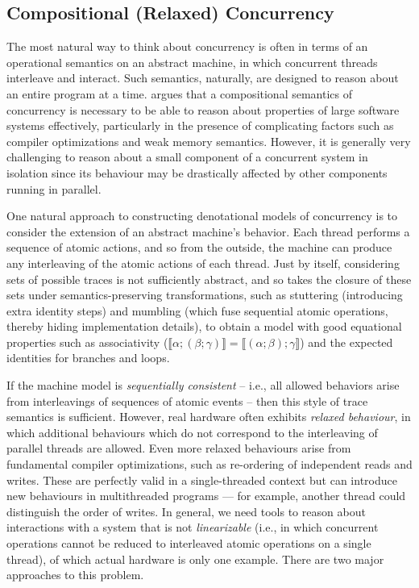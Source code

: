\documentclass[acmsmall,screen,review]{acmart}
\newcommand{\dnt}[1]{\llbracket{#1}\rrbracket}
\begin{document}
\subsection{Compositional (Relaxed) Concurrency}

The most natural way to think about concurrency is often in terms of an operational semantics on an
abstract machine, in which concurrent threads interleave and interact. Such semantics, naturally,
are designed to reason about an entire program at a time. \citet{batty-compositional-17} argues that
a compositional semantics of concurrency is necessary to be able to reason about properties of large
software systems effectively, particularly in the presence of complicating factors such as compiler
optimizations and weak memory semantics. However, it is generally very challenging to reason about a
small component of a concurrent system in isolation since its behaviour may be drastically affected
by other components running in parallel.

One natural approach to constructing denotational models of concurrency is to consider the
extension of an abstract machine's behavior. Each thread performs a sequence of atomic actions,
and so from the outside, the machine can produce any interleaving of the atomic actions of each
thread. Just by itself, considering sets of possible traces is not sufficiently abstract, and so
\citet{brookes-full-abstraction-96} takes the closure of these sets under semantics-preserving
transformations, such as stuttering (introducing extra identity steps) and mumbling (which fuse
sequential atomic operations, thereby hiding implementation details), to obtain a model with good
equational properties such as associativity
($\dnt{\alpha;(\beta;\gamma)} = \dnt{(\alpha;\beta);\gamma}$) and the expected identities for
branches and loops. 

If the machine model is \emph{sequentially consistent} -- i.e., all allowed behaviors arise from
interleavings of sequences of atomic events -- then this style of trace semantics is sufficient.
However, real hardware often exhibits \emph{relaxed behaviour}, in which additional behaviours
which do not correspond to the interleaving of parallel threads are allowed. Even more relaxed
behaviours arise from fundamental compiler optimizations, such as re-ordering of independent reads
and writes. These are perfectly valid in a single-threaded context but can introduce new
behaviours in multithreaded programs — for example, another thread could distinguish the order of
writes. In general, we need tools to reason about interactions with a system that is not
\emph{linearizable} (i.e., in which concurrent operations cannot be reduced to interleaved atomic
operations on a single thread), of which actual hardware is only one example. There are two major
approaches to this problem.
\end{document}

